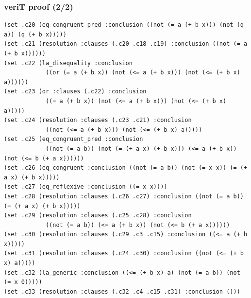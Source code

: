 \documentclass[svgnames,table,mathserif]{beamer}
\begin{document}
\begin{frame}[fragile]
\frametitle{veriT proof (2/2)}

{\tiny
\begin{verbatim}
(set .c20 (eq_congruent_pred :conclusion ((not (= a (+ b x))) (not (q a)) (q (+ b x)))))
(set .c21 (resolution :clauses (.c20 .c18 .c19) :conclusion ((not (= a (+ b x))))))
(set .c22 (la_disequality :conclusion
            ((or (= a (+ b x)) (not (<= a (+ b x))) (not (<= (+ b x) a))))))
(set .c23 (or :clauses (.c22) :conclusion
            ((= a (+ b x)) (not (<= a (+ b x))) (not (<= (+ b x) a)))))
(set .c24 (resolution :clauses (.c23 .c21) :conclusion
            ((not (<= a (+ b x))) (not (<= (+ b x) a)))))
(set .c25 (eq_congruent_pred :conclusion
            ((not (= a b)) (not (= (+ a x) (+ b x))) (<= a (+ b x)) (not (<= b (+ a x))))))
(set .c26 (eq_congruent :conclusion ((not (= a b)) (not (= x x)) (= (+ a x) (+ b x)))))
(set .c27 (eq_reflexive :conclusion ((= x x))))
(set .c28 (resolution :clauses (.c26 .c27) :conclusion ((not (= a b)) (= (+ a x) (+ b x)))))
(set .c29 (resolution :clauses (.c25 .c28) :conclusion
            ((not (= a b)) (<= a (+ b x)) (not (<= b (+ a x))))))
(set .c30 (resolution :clauses (.c29 .c3 .c15) :conclusion ((<= a (+ b x)))))
(set .c31 (resolution :clauses (.c24 .c30) :conclusion ((not (<= (+ b x) a)))))
(set .c32 (la_generic :conclusion ((<= (+ b x) a) (not (= a b)) (not (= x 0)))))
(set .c33 (resolution :clauses (.c32 .c4 .c15 .c31) :conclusion ()))
\end{verbatim}
}

\end{frame}
\end{document}
